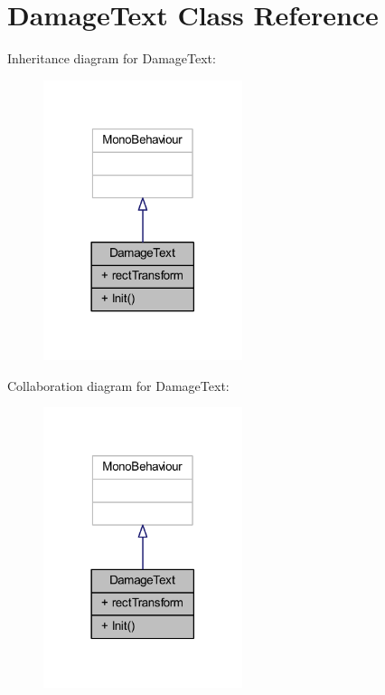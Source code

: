\hypertarget{class_damage_text}{}\section{Damage\+Text Class Reference}
\label{class_damage_text}


Inheritance diagram for Damage\+Text\+:\nopagebreak
\begin{figure}[H]
\begin{center}
\leavevmode
\includegraphics[width=165pt]{class_damage_text__inherit__graph}
\end{center}
\end{figure}


Collaboration diagram for Damage\+Text\+:\nopagebreak
\begin{figure}[H]
\begin{center}
\leavevmode
\includegraphics[width=165pt]{class_damage_text__coll__graph}
\end{center}
\end{figure}

